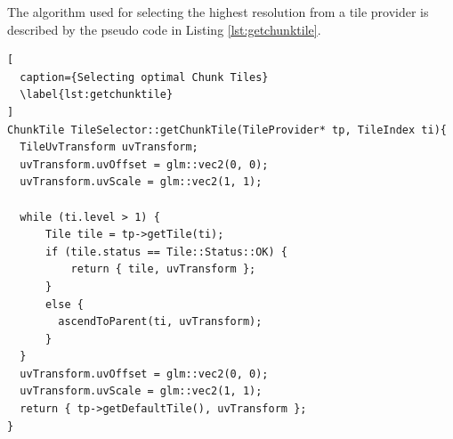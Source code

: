 The algorithm used for selecting the highest resolution  from a tile provider is described by the pseudo code in Listing \ref{lst:getchunktile}.

\begin{lstlisting}[
  caption={Selecting optimal Chunk Tiles} 
  \label{lst:getchunktile}
]
ChunkTile TileSelector::getChunkTile(TileProvider* tp, TileIndex ti){
  TileUvTransform uvTransform;
  uvTransform.uvOffset = glm::vec2(0, 0);
  uvTransform.uvScale = glm::vec2(1, 1);

  while (ti.level > 1) {
      Tile tile = tp->getTile(ti);
      if (tile.status == Tile::Status::OK) {
          return { tile, uvTransform };
      }
      else {
        ascendToParent(ti, uvTransform);
      }
  }
  uvTransform.uvOffset = glm::vec2(0, 0);
  uvTransform.uvScale = glm::vec2(1, 1);
  return { tp->getDefaultTile(), uvTransform };
}
\end{lstlisting}

